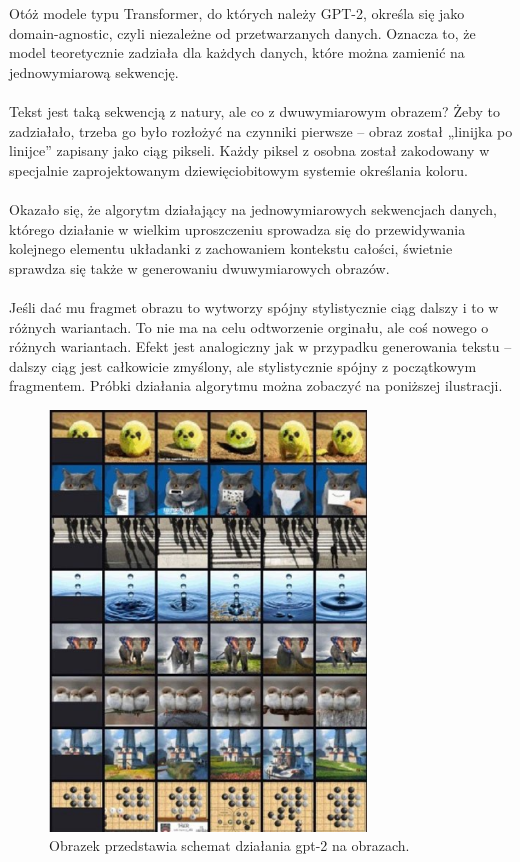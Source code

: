 \documentclass{article}
\begin{document}
Otóż modele typu Transformer, do których należy GPT-2, określa się jako domain-agnostic, czyli niezależne od przetwarzanych danych. Oznacza to, że model teoretycznie zadziała dla każdych danych, które można zamienić na jednowymiarową sekwencję.\\\\
Tekst jest taką sekwencją z natury, ale co z dwuwymiarowym obrazem? Żeby to zadziałało, trzeba go było rozłożyć na czynniki pierwsze – obraz został „linijka po linijce” zapisany jako ciąg pikseli. Każdy piksel z osobna został zakodowany w specjalnie zaprojektowanym dziewięciobitowym systemie określania koloru.\\\\
Okazało się, że algorytm działający na jednowymiarowych sekwencjach danych, którego działanie w wielkim uproszczeniu sprowadza się do przewidywania kolejnego elementu układanki z zachowaniem kontekstu całości, świetnie sprawdza się także w generowaniu dwuwymiarowych obrazów.\\\\
Jeśli dać mu fragmet obrazu to wytworzy spójny stylistycznie ciąg dalszy i to w różnych wariantach. To nie ma na celu odtworzenie orginału, ale coś nowego o różnych wariantach. Efekt jest analogiczny jak w przypadku generowania tekstu – dalszy ciąg jest całkowicie zmyślony, ale stylistycznie spójny z początkowym fragmentem. Próbki działania algorytmu można zobaczyć na poniższej ilustracji.
\begin{figure}[h]
        \centering
        \includegraphics[width=0.75\textwidth]{images/obrazki.png}
        \caption{Obrazek przedstawia schemat działania gpt-2 na obrazach.}
        \label{fig:mesh1}
    \end{figure}
\end{document}
